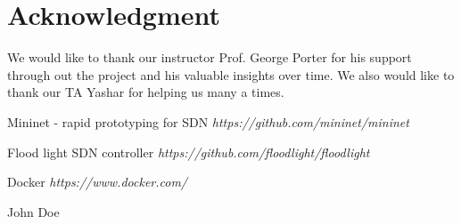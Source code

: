 \documentclass[conference]{IEEEtran}
\begin{document}
\section*{Acknowledgment}
We would like to thank our instructor Prof. George Porter for his support through out the project and his valuable insights over time. We also would like to thank our TA Yashar for helping us many a times. 

\begin{thebibliography}{10}

Mininet - rapid prototyping for SDN
\textit{https://github.com/mininet/mininet}

Flood light SDN controller
\textit{https://github.com/floodlight/floodlight}

Docker
\textit{https://www.docker.com/}

\end{thebibliography}


\begin{IEEEbiography}{John Doe}
\blindtext
\end{IEEEbiography}
\end{document}
